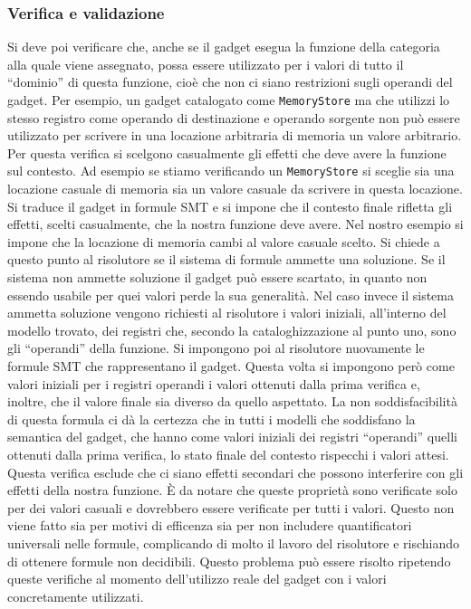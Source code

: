 \subsubsection{Verifica e validazione}\label{s:verifica_validazione}
Si deve poi verificare che, anche se il gadget esegua la funzione
della categoria alla quale viene assegnato, possa essere utilizzato
per i valori di tutto il ``dominio'' di questa funzione, cioè che non
ci siano restrizioni sugli operandi del gadget. Per esempio, un gadget
catalogato come \lstinline{MemoryStore} ma che utilizzi lo stesso
registro come operando di destinazione e operando sorgente non può
essere utilizzato per scrivere in una locazione arbitraria di memoria
un valore arbitrario. Per questa verifica si scelgono casualmente gli
effetti che deve avere la funzione sul contesto. Ad esempio se stiamo
verificando un \lstinline{MemoryStore} si sceglie sia una locazione
casuale di memoria sia un valore casuale da scrivere in questa
locazione. Si traduce il gadget in formule SMT e si impone che il
contesto finale rifletta gli effetti, scelti casualmente, che la
nostra funzione deve avere. Nel nostro esempio si impone che la
locazione di memoria cambi al valore casuale scelto. Si chiede a
questo punto al risolutore se il sistema di formule ammette una
soluzione. Se il sistema non ammette soluzione il gadget può essere
scartato, in quanto non essendo usabile per quei valori perde la sua
generalità. Nel caso invece il sistema ammetta soluzione vengono
richiesti al risolutore i valori iniziali, all'interno del modello
trovato, dei registri che, secondo la cataloghizzazione al punto uno,
sono gli ``operandi'' della funzione. Si impongono poi al risolutore
nuovamente le formule SMT che rappresentano il gadget.  Questa volta
si impongono però come valori iniziali per i registri operandi i
valori ottenuti dalla prima verifica e, inoltre, che il valore finale
sia diverso da quello aspettato. La non soddisfacibilità di questa
formula ci dà la certezza che in tutti i modelli che soddisfano la
semantica del gadget, che hanno come valori iniziali dei registri
``operandi'' quelli ottenuti dalla prima verifica, lo stato finale del
contesto rispecchi i valori attesi. Questa verifica esclude che ci
siano effetti secondari che possono interferire con gli effetti della
nostra funzione. È da notare che queste proprietà sono verificate solo
per dei valori casuali e dovrebbero essere verificate per tutti i
valori. Questo non viene fatto sia per motivi di efficenza sia per
non includere quantificatori universali nelle formule, complicando di
molto il lavoro del risolutore e rischiando di ottenere formule non
decidibili. Questo problema può essere risolto ripetendo queste
verifiche al momento dell'utilizzo reale del gadget con i valori
concretamente utilizzati.

